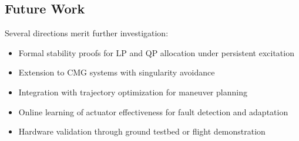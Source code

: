 \documentclass[conference]{IEEEtran}
\begin{document}
\subsection{Future Work}
Several directions merit further investigation:
\begin{itemize}
    \item Formal stability proofs for LP and QP allocation under persistent excitation
    \item Extension to CMG systems with singularity avoidance
    \item Integration with trajectory optimization for maneuver planning
    \item Online learning of actuator effectiveness for fault detection and adaptation
    \item Hardware validation through ground testbed or flight demonstration
\end{itemize}


% 
\end{document}
